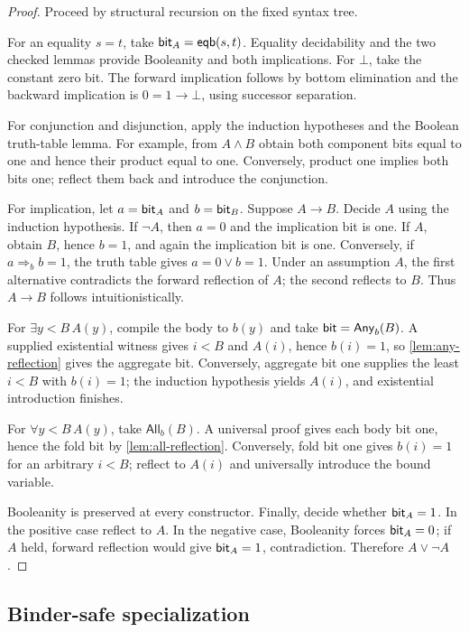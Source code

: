 \begin{proof}
Proceed by structural recursion on the fixed syntax tree.

For an equality \(s=t\), take \(\mathsf{bit}_A=\mathsf{eqb}(s,t)\).  Equality decidability and the two checked  lemmas provide Booleanity and both implications.  For \(\bot\), take the constant zero bit.  The forward implication follows by bottom elimination and the backward implication is \(0=1\to\bot\), using successor separation.

For conjunction and disjunction, apply the induction hypotheses and the Boolean truth-table lemma.  For example, from \(A\wedge B\) obtain both component bits equal to one and hence their product equal to one.  Conversely, product one implies both bits one; reflect them back and introduce the conjunction.

For implication, let \(a=\mathsf{bit}_A\) and \(b=\mathsf{bit}_B\).  Suppose \(A\to B\).  Decide \(A\) using the induction hypothesis.  If \(\neg A\), then \(a=0\) and the implication bit is one.  If \(A\), obtain \(B\), hence \(b=1\), and again the implication bit is one.  Conversely, if \(a\Rightarrow_b b=1\), the truth table gives \(a=0\vee b=1\).  Under an assumption \(A\), the first alternative contradicts the forward reflection of \(A\); the second reflects to \(B\).  Thus \(A\to B\) follows intuitionistically.

For \(\exists y<B\,A(y)\), compile the body to \(b(y)\) and take \(\mathsf{bit}=\mathsf{Any}_b(B)\).  A supplied existential witness gives \(i<B\) and \(A(i)\), hence \(b(i)=1\), so \cref{lem:any-reflection} gives the aggregate bit.  Conversely, aggregate bit one supplies the least \(i<B\) with \(b(i)=1\); the induction hypothesis yields \(A(i)\), and existential introduction finishes.

For \(\forall y<B\,A(y)\), take \(\mathsf{All}_b(B)\).  A universal proof gives each body bit one, hence the fold bit by \cref{lem:all-reflection}.  Conversely, fold bit one gives \(b(i)=1\) for an arbitrary \(i<B\); reflect to \(A(i)\) and universally introduce the bound variable.

Booleanity is preserved at every constructor.  Finally, decide whether \(\mathsf{bit}_A=1\).  In the positive case reflect to \(A\).  In the negative case, Booleanity forces \(\mathsf{bit}_A=0\); if \(A\) held, forward reflection would give \(\mathsf{bit}_A=1\), contradiction.  Therefore \(A\vee\neg A\).
\end{proof}

\subsection{Binder-safe specialization}

